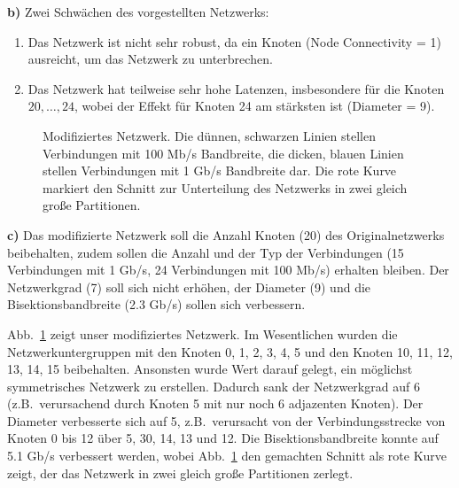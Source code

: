 \textbf{b)} Zwei Schwächen des vorgestellten Netzwerks:
\begin{enumerate}
 \item Das Netzwerk ist nicht sehr robust, da ein Knoten (Node Connectivity = 1) ausreicht, um das Netzwerk zu unterbrechen.
 \item Das Netzwerk hat teilweise sehr hohe Latenzen, insbesondere für die Knoten $20,\dots,24$, wobei der Effekt für Knoten 24 am stärksten ist (Diameter = 9). 
\end{enumerate}

\begin{figure}[tb]
 \centering 
 
 \caption{Modifiziertes Netzwerk. Die dünnen, schwarzen Linien stellen Verbindungen mit 100 Mb/s Bandbreite, die dicken, blauen Linien stellen Verbindungen mit 1 Gb/s Bandbreite dar. Die rote Kurve markiert den Schnitt zur Unterteilung des Netzwerks in zwei gleich große Partitionen.}
 \label{fig:eigenesNetzwerk}
\end{figure}

\textbf{c)} Das modifizierte Netzwerk soll die Anzahl Knoten (20) des Originalnetzwerks beibehalten, zudem sollen die Anzahl und der Typ der Verbindungen (15 Verbindungen mit 1 Gb/s, 24 Verbindungen mit 100 Mb/s) erhalten bleiben. Der Netzwerkgrad (7) soll sich nicht erhöhen, der Diameter (9) und die Bisektionsbandbreite (2.3 Gb/s) sollen sich verbessern.

Abb.~\ref{fig:eigenesNetzwerk} zeigt unser modifiziertes Netzwerk. Im Wesentlichen wurden die Netzwerkuntergruppen mit den Knoten 0, 1, 2, 3, 4, 5 und den Knoten 10, 11, 12, 13, 14, 15 beibehalten. Ansonsten wurde Wert darauf gelegt, ein möglichst symmetrisches Netzwerk zu erstellen. Dadurch sank der Netzwerkgrad auf 6 (z.B.~verursachend durch Knoten 5 mit nur noch 6 adjazenten Knoten). Der Diameter verbesserte sich auf 5, z.B.~verursacht von der Verbindungsstrecke von Knoten 0 bis 12 über 5, 30, 14, 13 und 12. Die Bisektionsbandbreite konnte auf 5.1 Gb/s verbessert werden, wobei Abb.~\ref{fig:eigenesNetzwerk} den gemachten Schnitt als rote Kurve zeigt, der das Netzwerk in zwei gleich große Partitionen zerlegt.